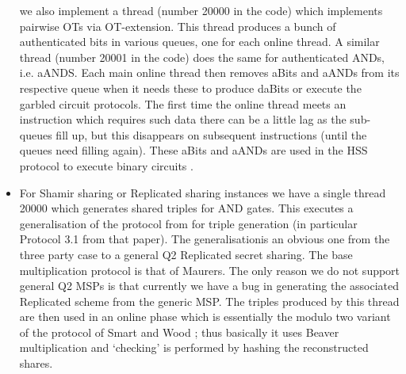\begin{itemize}
	we also implement a thread (number 20000 in the code)
which implements pairwise OTs via OT-extension.
This thread produces a bunch of authenticated bits in various
queues, one for each online thread.
A similar thread (number 20001 in the code) does the
same for authenticated ANDs, i.e. aANDS.
Each main online thread then removes aBits and aANDs 
from its respective queue when it needs these to produce  
daBits or execute the garbled circuit protocols.
The first time the online thread meets an instruction which
requires such data there can be a little lag as the sub-queues
fill up, but this disappears on subsequent instructions
(until the queues need filling again).
These aBits and aANDs are used in the HSS protocol to
	execute binary circuits \cite{AC:HazSchSor17}.
\item For Shamir sharing or Replicated sharing instances
we have a single thread 20000 which generates shared
triples for AND gates.
This executes a generalisation of the protocol from
\cite{DBLP:conf/sp/ArakiBFLLNOWW17} for triple generation
(in particular Protocol 3.1 from that paper).
The generalisationis an obvious one from the three party
case to a general Q2 Replicated secret sharing.
The base multiplication protocol is that of Maurers.
The only reason we do not support general Q2 MSPs is
that currently we have a bug in generating the associated
Replicated scheme from the generic MSP.
The triples produced by this thread are then used in an
online phase which is essentially the modulo two variant
of the protocol of Smart and Wood \cite{SW18}; thus
basically it uses Beaver multiplication and `checking'
is performed by hashing the reconstructed shares.

\end{itemize}


